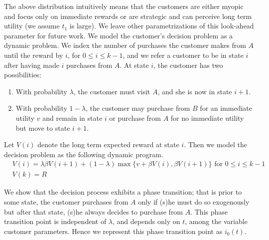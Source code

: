 The above distribution intuitively means that the customers are either myopic and focus only on immediate rewards or are strategic and can perceive long term utility (we assume $t_1$ is large).
We leave other parametrizations of this look-ahead parameter for future work.
We model the customer's decision problem as a dynamic problem. We index the number of purchases the customer makes from $A$ until the reward by $i$, for $0 \leq i \leq k-1$, and we refer a customer to be in state $i$ after having made $i$ purchases from $A$. At state $i$, the customer has two possibilities:
\begin{enumerate}
\item
With probability $\lambda$, the customer must visit $A$, and she is now in state $i+1$.
\item
With probability $1-\lambda$, the customer may purchase from $B$ for an immediate utility $v$ and remain in state $i$ or purchase from $A$ for no immediate utility but move to state $i+1$.
\end{enumerate}

Let $V(i)$ denote the long term expected reward at state $i$. Then we model the decision problem as the following dynamic program.
\begin{align*}
& V(i) = \lambda \beta V(i+1) + (1-\lambda)\max\{v+\beta V(i),\beta V(i+1) \} \mbox{ for } 0\leq i \leq k-1 \\
& V(k) = R
\end{align*}

We show that the decision process exhibits a phase transition; that is prior to some state, the customer purchases from $A$ only if (s)he must do so exogenously but after that state, (s)he always decides to purchase from $A$. 
This phase transition point is independent of $\lambda$, and depends only on $t$, among the variable customer parameters.
Hence we represent this phase transition point as $i_0(t)$.

